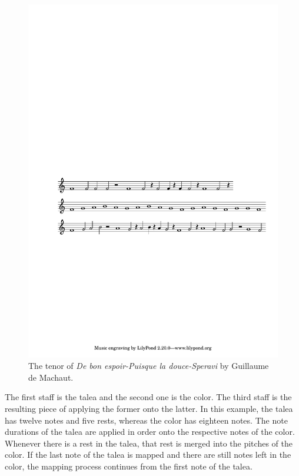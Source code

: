 \begin{figure}[!h]
 \centering
 \includegraphics[width=\columnwidth]{imgs/background/isorhythm.pdf}
 \caption{The tenor of \textit{De bon espoir-Puisque la douce-Speravi} by Guillaume de Machaut.}
 \label{fig:isorhythm}
\end{figure}

The first staff is the talea and the second one is the color. The third staff is the resulting piece of applying the former onto the latter. In this example, the talea has twelve notes and five rests, whereas the color has eighteen notes. The note durations of the talea are applied in order onto the respective notes of the color. Whenever there is a rest in the talea, that rest is merged into the pitches of the color. If the last note of the talea is mapped and there are still notes left in the color, the mapping process continues from the first note of the talea.

